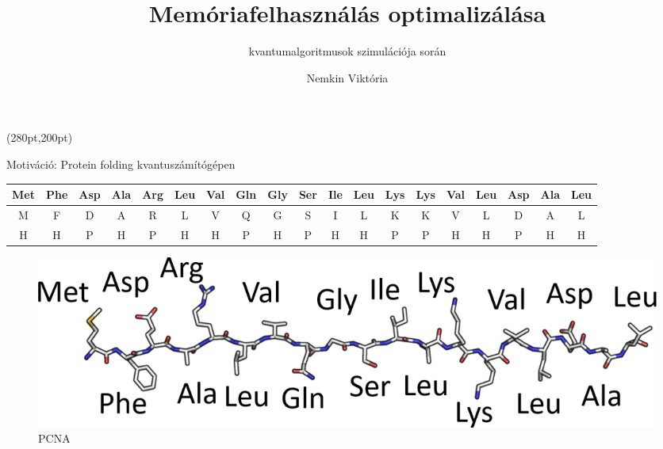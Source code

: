 \documentclass[aspectratio=169]{beamer}
\author[Nemkin Viktória]{Nemkin Viktória}
\institute[]{
\begin{small}dr. Friedl Katalin\end{small}\\
\begin{footnotesize}Számítástudományi és Információelméleti Tanszék\end{footnotesize}
}
\title{Memóriafelhasználás optimalizálása}
\subtitle{kvantumalgoritmusok szimulációja során}
\date{}
\begin{document}
\begin{frame}
\titlepage

\begin{textblock*}{150pt}(280pt,200pt) %

\end{textblock*}
\end{frame}


\begin{frame}{Motiváció: Protein folding kvantuszámítógépen}

\begin{tabular}{c|c|c|c|c|c|c|c|c|c|c|c|c|c|c|c|c|c|c}

\tiny Met & Phe & Asp & Ala & Arg & Leu & Val & Gln & Gly & Ser & Ile & Leu & Lys & Lys & Val & Leu & Asp & Ala & Leu \\

\hline
M & F & D & A & R & L & V & Q & G & S & I & L & K & K & V & L & D & A & L \\
\hline
H & H & P & H & P & H & H & P & H & P & H & H & P & P & H & H & P & H & H
\end{tabular}


\begin{figure}[H]
    \centering
    \includegraphics[width=0.5\linewidth]{./figures/protein_structure_primary.png}
    \caption{PCNA}
  \end{figure}
\end{frame}
\end{document}

